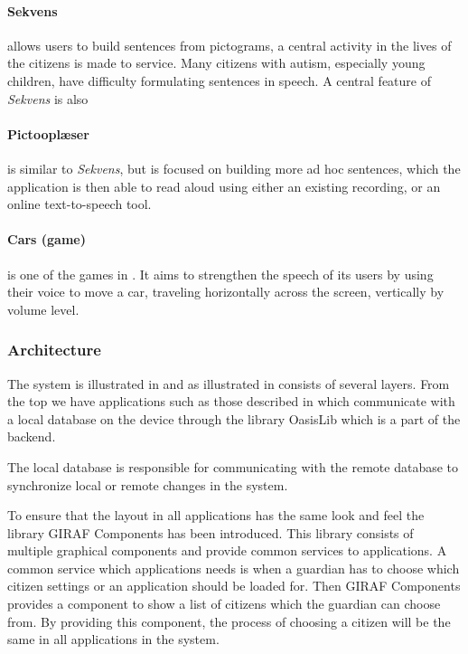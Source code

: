 \paragraph{Sekvens}
allows users to build sentences from pictograms, a central activity in the lives of the citizens \giraf is made to service. Many citizens with autism, especially young children, have difficulty formulating sentences in speech. A central feature of \textit{Sekvens} is also 

\paragraph{Pictooplæser}
is similar to \textit{Sekvens}, but is focused on building more ad hoc sentences, which the application is then able to read aloud using either an existing recording, or an online text-to-speech tool. 

\paragraph{Cars (game)}
is one of the games in \giraf.
It aims to strengthen the speech of its users by using their voice to move a car, traveling horizontally across the screen, vertically by volume level.


\subsubsection{Architecture}
The \giraf system is illustrated in  and as illustrated in consists of several layers. From the top we have applications such as those described in  which communicate with a local database on the device through the library OasisLib which is a part of the \giraf backend.

The local database is responsible for communicating with the remote database to synchronize local or remote changes in the system.

To ensure that the layout in all applications has the same look and feel the library GIRAF Components has been introduced.
This library consists of multiple graphical components and provide common services to applications.
A common service which applications needs is when a guardian has to choose which citizen settings or an application should be loaded for. Then GIRAF Components provides a component to show a list of citizens which the guardian can choose from. By providing this component, the process of choosing a citizen will be the same in all applications in the \giraf system.

